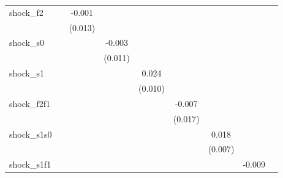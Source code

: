 {\begin{tabular}{l*{8}{c}}
\addlinespace
shock\_f2    &                     &      -0.001         &                     &                     &                     &                     &                     &                     \\
            &                     &     (0.013)         &                     &                     &                     &                     &                     &                     \\
\addlinespace
shock\_s0    &                     &                     &      -0.003         &                     &                     &                     &                     &                     \\
            &                     &                     &     (0.011)         &                     &                     &                     &                     &                     \\
\addlinespace
shock\_s1    &                     &                     &                     &       0.024\sym{**} &                     &                     &                     &                     \\
            &                     &                     &                     &     (0.010)         &                     &                     &                     &                     \\
\addlinespace
shock\_f2f1  &                     &                     &                     &                     &      -0.007         &                     &                     &                     \\
            &                     &                     &                     &                     &     (0.017)         &                     &                     &                     \\
\addlinespace
shock\_s1s0  &                     &                     &                     &                     &                     &       0.018\sym{**} &                     &                     \\
            &                     &                     &                     &                     &                     &     (0.007)         &                     &                     \\
\addlinespace
shock\_s1f1  &                     &                     &                     &                     &                     &                     &      -0.009         &                     \\

\end{tabular}}
